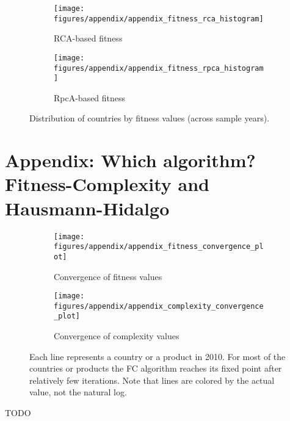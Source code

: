 \documentclass[11pt]{article}
\begin{document}
\begin{appendices}
\begin{figure}
     \centering
     \begin{subfigure}[b]{0.45\textwidth}
         \centering
         \texttt{[image: figures/appendix/appendix\_fitness\_rca\_histogram]}
         \caption{RCA-based fitness}
         \label{fig:rca_fit_hist}
     \end{subfigure}
     \hfill
     \begin{subfigure}[b]{0.45\textwidth}
         \centering
         \texttt{[image: figures/appendix/appendix\_fitness\_rpca\_histogram]}
         \caption{RpcA-based fitness}
         \label{fig:rpca_fit_hist}
     \end{subfigure}
        \caption{Distribution of countries by fitness values (across sample years).}
        \label{fig:rca_rpca_fit_hist}
\end{figure}



\newpage

\section{Appendix: Which algorithm? Fitness-Complexity and Hausmann-Hidalgo}
\label{sec:appendix-algorithm}

\begin{figure}
     \centering
     \begin{subfigure}[b]{0.45\textwidth}
         \centering
         \texttt{[image: figures/appendix/appendix\_fitness\_convergence\_plot]}
	 \caption{Convergence of fitness values}
         \label{fig:fit_conv}
     \end{subfigure}
     \hfill
     \begin{subfigure}[b]{0.45\textwidth}
         \centering
         \texttt{[image: figures/appendix/appendix\_complexity\_convergence\_plot]}
         \caption{Convergence of complexity values}
         \label{fig:comp_conv}
     \end{subfigure}
     \caption{Each line represents a country or a product in 2010. For most of the countries or products the FC algorithm reaches its fixed point after relatively few iterations. Note that lines are colored by the actual value, not the natural log.}
        \label{fig:fc_conv}
\end{figure}


TODO
\end{appendices}

\newpage
\end{document}
